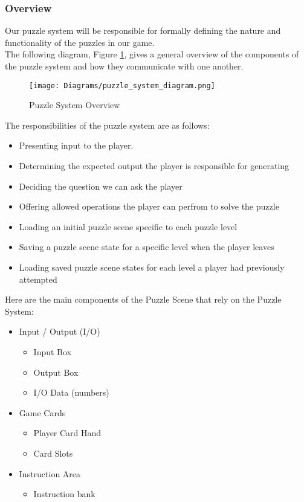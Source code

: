 \subsubsection{Overview}
Our puzzle system will be responsible for formally defining the nature and
functionality of the puzzles in our game.\\

The following diagram, Figure \ref{fig:puzzle_system_diagram}, gives a general overview of the components
of the puzzle system and how they communicate with one another.

\begin{figure}[!hb]
  \caption{Puzzle System Overview}
  \label{fig:puzzle_system_diagram}
  \centering
  \texttt{[image: Diagrams/puzzle\_system\_diagram.png]}
\end{figure}
\vfill
\clearpage

The responsibilities of the puzzle system are as follows:

\begin{itemize}
	\item Presenting input to the player.
	\item Determining the expected output the player is responsible for generating
	\item Deciding the question we can ask the player
	\item Offering allowed operations the player can perfrom to solve the puzzle
	\item Loading an initial puzzle scene specific to each puzzle level
	\item Saving a puzzle scene state for a specific level when the player leaves
	\item Loading saved puzzle scene states for each level a player had previously attempted
\end{itemize}

Here are the main components of the Puzzle Scene that rely on the Puzzle System:

\begin{itemize}
	\item Input / Output (I/O)
	\begin{itemize}
		\item Input Box
		\item Output Box
		\item I/O Data (numbers)
	\end{itemize}

	\item Game Cards
	\begin{itemize}
		\item Player Card Hand
		\item Card Slots
	\end{itemize}

	\item Instruction Area
	\begin{itemize}
		\item Instruction bank
	\end{itemize}
\end{itemize}

